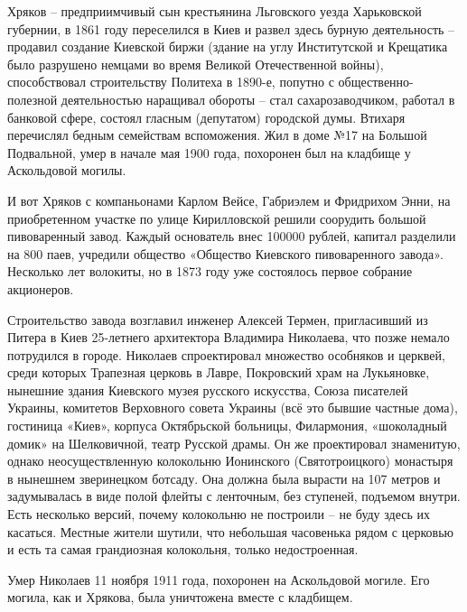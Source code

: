 Хряков – предприимчивый сын крестьянина Льговского уезда Харьковской губернии, в 1861 году переселился в Киев и развел здесь бурную деятельность – продавил создание Киевской биржи (здание на углу Институтской и Крещатика было разрушено немцами во время Великой Отечественной войны), способствовал строительству Политеха в 1890-е, попутно с общественно-полезной деятельностью наращивал обороты – стал сахарозаводчиком, работал в банковой сфере, состоял гласным (депутатом) городской думы. Втихаря перечислял бедным семействам вспоможения. Жил в доме №17 на Большой Подвальной, умер в начале мая 1900 года, похоронен был на кладбище у Аскольдовой могилы.

И вот Хряков с компаньонами Карлом Вейсе, Габриэлем и Фридрихом Энни, на приобретенном участке по улице Кирилловской решили соорудить большой пивоваренный завод. Каждый основатель внес 100000 рублей, капитал разделили на 800 паев, учредили общество «Общество Киевского пивоваренного завода». Несколько лет волокиты, но в 1873 году уже состоялось первое собрание акционеров.

Строительство завода возглавил инженер Алексей Термен, пригласивший из Питера в Киев 25-летнего архитектора Владимира Николаева, что позже немало потрудился в городе. Николаев спроектировал множество особняков и церквей, среди которых Трапезная церковь в Лавре, Покровский храм на Лукьяновке, нынешние здания Киевского музея русского искусства, Союза писателей Украины, комитетов Верховного совета Украины (всё это бывшие частные дома), гостиница «Киев», корпуса Октябрьской больницы, Филармония, «шоколадный домик» на Шелковичной, театр Русской драмы. Он же проектировал знаменитую, однако неосуществленную колокольню Ионинского (Святотроицкого) монастыря в нынешнем зверинецком ботсаду. Она должна была вырасти на 107 метров и задумывалась в виде полой флейты с ленточным, без ступеней, подъемом внутри. Есть несколько версий, почему колокольню не построили – не буду здесь их касаться. Местные жители шутили, что небольшая часовенька рядом с церковью и есть та самая грандиозная колокольня, только недостроенная.

Умер Николаев 11 ноября 1911 года, похоронен на Аскольдовой могиле. Его могила, как и Хрякова, была уничтожена вместе с кладбищем.

